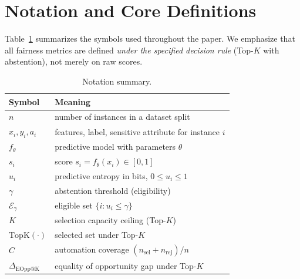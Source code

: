 \section{Notation and Core Definitions}
\label{sec:notation}

Table~\ref{tab:notation} summarizes the symbols used throughout the paper. We emphasize that all fairness metrics are defined \emph{under the specified decision rule} (Top-$K$ with abstention), not merely on raw scores.

\begin{table}[t]
\centering
\caption{Notation summary.}
\label{tab:notation}
\begin{tabular}{ll}
\toprule
Symbol & Meaning \\
\midrule
$n$ & number of instances in a dataset split \\
$x_i, y_i, a_i$ & features, label, sensitive attribute for instance $i$ \\
$f_\theta$ & predictive model with parameters $\theta$ \\
$s_i$ & score $s_i=f_\theta(x_i)\in[0,1]$ \\
$u_i$ & predictive entropy in bits, $0\leq u_i\leq1$ \\
$\gamma$ & abstention threshold (eligibility) \\
$\mathcal{E}_\gamma$ & eligible set $\{i: u_i\le \gamma\}$ \\
$K$ & selection capacity ceiling (Top-$K$) \\
$\text{TopK}(\cdot)$ & selected set under Top-$K$ \\
$C$ & automation coverage $(n_{\mathrm{sel}}+n_{\mathrm{rej}})/n$ \\
$\Delta_{\mathrm{EOpp@K}}$ & equality of opportunity gap under Top-$K$ \\
\bottomrule
\end{tabular}
\end{table}
